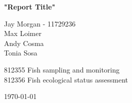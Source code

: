\begin{titlepage}


\begin{center}                                          %
    \vspace*{3cm}                                           %

    \LARGE                                                  %
    \textbf{"Report Title"}

    \vspace{0.5cm}                                          %

    \vspace{1.5cm}                                          %

    \Large                                                  %
    Jay Morgan - 11729236\\
    Max Loimer\\
    Andy Cosma\\
    Tonia Sosa\\
    \vspace{3cm}                                            %

	812355 Fish sampling and monitoring\\
    812356 Fish ecological status assessment
    \vspace{.5cm}                                           %

    \today                                                  %
    \vfill                                                  %


\end{center}
\end{titlepage}
